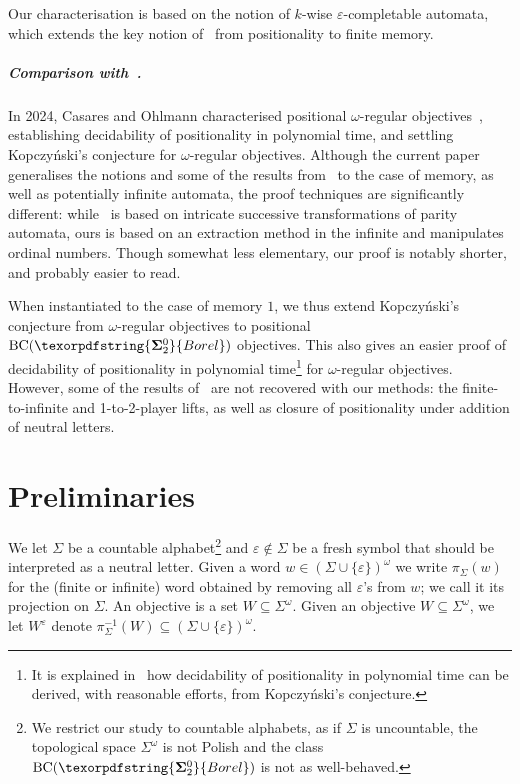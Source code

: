 \documentclass[a4paper,UKenglish,cleveref, thm-restate]{lipics-v2021}
\newcommand{\eps}{\varepsilon}
\newcommand{\boldclass}[3]{\texorpdfstring{\ensuremath{\mathbf{#1}^{#2}_{#3}}}{Borel}}
\newcommand{\BCSigma}{\mathrm{BC}(\boldclass{\Sigma}{0}{2})}
\newcommand{\oo}{\omega}
\renewcommand{\SS}{\Sigma}
\begin{document}
Our characterisation is based on the notion of $k$-wise $\eps$-completable automata, which extends the key notion of~\cite{CO24Positional} from positionality to finite memory.  

\subparagraph*{Comparison with~\cite{CO24Positional}.}
In 2024, Casares and Ohlmann characterised positional $\oo$-regular objectives~\cite{CO24Positional}, establishing decidability of positionality in polynomial time, and settling Kopczyński's conjecture for $\oo$-regular objectives.
Although the current paper generalises the notions and some of the results from~\cite{CO24Positional} to the case of memory, as well as potentially infinite automata, the proof techniques are significantly different: while~\cite{CO24Positional} is based on intricate successive transformations of parity automata, ours is based on an extraction method in the infinite and manipulates ordinal numbers.
Though somewhat less elementary, our proof is notably shorter, and probably easier to read.

When instantiated to the case of memory $1$, we thus extend Kopczyński's conjecture from $\omega$-regular objectives to positional $\BCSigma$ objectives.
This also gives an easier proof of decidability of positionality in polynomial time\footnote{It is explained in~\cite[Theorem~5.3]{CO24Positional} how decidability of positionality in polynomial time can be derived, with reasonable efforts, from Kopczy\'nski's conjecture.} for $\omega$-regular objectives.
However, some of the results of~\cite{CO24Positional} are not recovered with our methods: the finite-to-infinite and 1-to-2-player lifts, as well as closure of positionality under addition of neutral letters. 
\section{Preliminaries}
We let $\Sigma$ be a countable alphabet\footnote{We restrict our study to countable alphabets, as if $\SS$ is uncountable, the topological space $\SS^\omega$ is not Polish and the class $\BCSigma$ is not as well-behaved.} and $\eps\notin \Sigma$ be a fresh symbol that should be interpreted as a neutral letter.
Given a word $w \in (\Sigma \cup \{\eps\})^\omega$ we write $\pi_\Sigma(w)$ for the (finite or infinite) word obtained by removing all $\eps$'s from $w$; we call it its projection on $\Sigma$.
An objective is a set $W \subseteq \Sigma^\omega$.
Given an objective $W \subseteq \Sigma^\omega$, we let $W^\eps$ denote $\pi_\Sigma^{-1}(W) \subseteq (\Sigma \cup \{\eps\})^\omega$.
\end{document}
